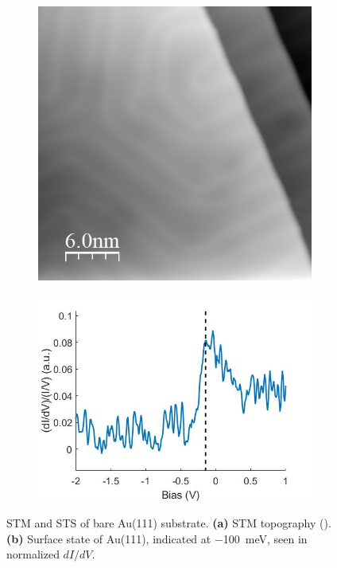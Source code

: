 \begin{figure} [H]
    \centering
    \begin{subfigure}[t]{0.44\textwidth}
    \includegraphics[width=\textwidth]{pictures/au111_1V_5pA.jpg}
    \caption{}
    \end{subfigure}
    \hfill
    \begin{subfigure}[t]{0.53\textwidth}
    \includegraphics[width=\textwidth]{pictures/au111_surface_state.jpg}
    \caption{}
    \end{subfigure}
    
    \caption{STM and STS of bare Au(111) substrate. \textbf{(a)} STM topography (). \textbf{(b)} Surface state of Au(111), indicated at \SI{-100}{meV}, seen in normalized $dI/dV$.}
    \label{fig:expsetup:Au111}
\end{figure}


